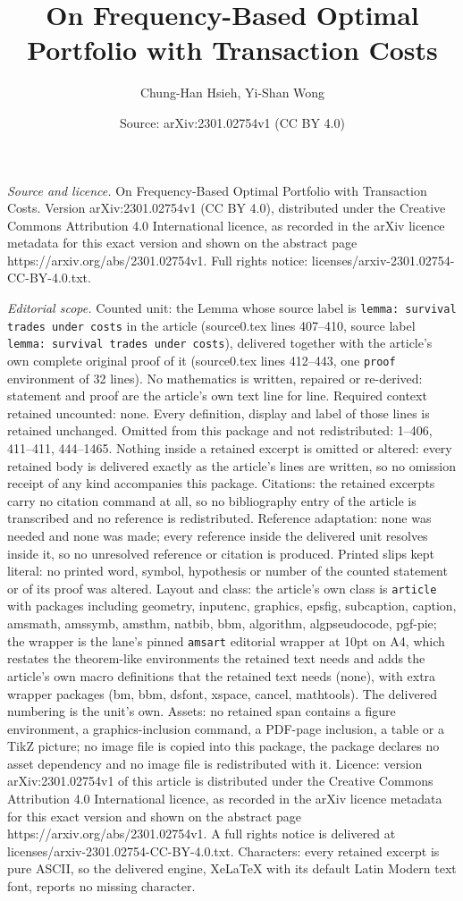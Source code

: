 \documentclass[10pt,a4paper]{amsart}
\title[On Frequency-Based Optimal Portfolio with Transaction Costs]{On Frequency-Based Optimal Portfolio with Transaction Costs}
\author{Chung-Han Hsieh, Yi-Shan Wong}
\date{Source: arXiv:2301.02754v1 (CC BY 4.0)}
\begin{document}
\maketitle

\noindent\emph{Source and licence.} On Frequency-Based Optimal Portfolio with Transaction Costs. Version arXiv:2301.02754v1 (CC BY 4.0), distributed under the Creative Commons Attribution 4.0 International licence, as recorded in the arXiv licence metadata for this exact version and shown on the abstract page https://arxiv.org/abs/2301.02754v1. Full rights notice: licenses/arxiv-2301.02754-CC-BY-4.0.txt.\par\smallskip

\noindent\textit{Editorial scope.} Counted unit: the Lemma whose source label is \texttt{lemma: survival trades under costs} in the article (source0.tex lines 407--410, source label \texttt{lemma: survival trades under costs}), delivered together with the article's own complete original proof of it (source0.tex lines 412--443, one \texttt{proof} environment of 32 lines). No mathematics is written, repaired or re-derived: statement and proof are the article's own text line for line. Required context retained uncounted: none. Every definition, display and label of those lines is retained unchanged. Omitted from this package and not redistributed: 1--406, 411--411, 444--1465. Nothing inside a retained excerpt is omitted or altered: every retained body is delivered exactly as the article's lines are written, so no omission receipt of any kind accompanies this package. Citations: the retained excerpts carry no citation command at all, so no bibliography entry of the article is transcribed and no reference is redistributed. Reference adaptation: none was needed and none was made; every reference inside the delivered unit resolves inside it, so no unresolved reference or citation is produced. Printed slips kept literal: no printed word, symbol, hypothesis or number of the counted statement or of its proof was altered. Layout and class: the article's own class is \texttt{article} with packages including geometry, inputenc, graphics, epsfig, subcaption, caption, amsmath, amssymb, amsthm, natbib, bbm, algorithm, algpseudocode, pgf-pie; the wrapper is the lane's pinned \texttt{amsart} editorial wrapper at 10pt on A4, which restates the theorem-like environments the retained text needs and adds the article's own macro definitions that the retained text needs (none), with extra wrapper packages (bm, bbm, dsfont, xspace, cancel, mathtools). The delivered numbering is the unit's own. Assets: no retained span contains a figure environment, a graphics-inclusion command, a PDF-page inclusion, a table or a TikZ picture; no image file is copied into this package, the package declares no asset dependency and no image file is redistributed with it. Licence: version arXiv:2301.02754v1 of this article is distributed under the Creative Commons Attribution 4.0 International licence, as recorded in the arXiv licence metadata for this exact version and shown on the abstract page https://arxiv.org/abs/2301.02754v1. A full rights notice is delivered at licenses/arxiv-2301.02754-CC-BY-4.0.txt. Characters: every retained excerpt is pure ASCII, so the delivered engine, XeLaTeX with its default Latin Modern text font, reports no missing character.
\end{document}
